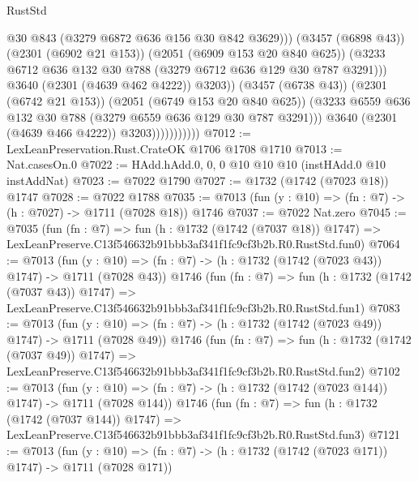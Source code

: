 \begin{lexlean}{RustStd}
\begin{coremodule}
                                      @30
                                      @843
                                      (@3279 @6872 @636 @156 @30 @842 @3629)))
                                  (@3457 (@6898 @43))
                                  (@2301 (@6902 @21 @153))
                                  (@2051 (@6909 @153 @20 @840 @625))
                                  (@3233
                                    @6712
                                    @636
                                    @132
                                    @30
                                    @788
                                    (@3279 @6712 @636 @129 @30 @787 @3291)))
                                @3640
                                (@2301 (@4639 @462 @4222))
                                @3203))
                            (@3457 (@6738 @43))
                            (@2301 (@6742 @21 @153))
                            (@2051 (@6749 @153 @20 @840 @625))
                            (@3233 @6559 @636 @132 @30 @788 (@3279 @6559 @636 @129 @30 @787 @3291)))
                          @3640
                          (@2301 (@4639 @466 @4222))
                          @3203)))))))))))
@7012 := LexLeanPreservation.Rust.CrateOK @1706 @1708 @1710
@7013 := Nat.casesOn.{0}
@7022 := HAdd.hAdd.{0, 0, 0} @10 @10 @10 (instHAdd.{0} @10 instAddNat)
@7023 := @7022 @1790
@7027 := @1732 (@1742 (@7023 @18)) @1747
@7028 := @7022 @1788
@7035 := @7013 (fun (y : @10) => (fn : @7) -> (h : @7027) -> @1711 (@7028 @18)) @1746
@7037 := @7022 Nat.zero
@7045 := @7035
    (fun (fn : @7) =>
    fun (h : @1732 (@1742 (@7037 @18)) @1747) =>
    LexLeanPreserve.C13f546632b91bbb3af341f1fc9cf3b2b.R0.RustStd.fun0)
@7064 := @7013
    (fun (y : @10) => (fn : @7) -> (h : @1732 (@1742 (@7023 @43)) @1747) -> @1711 (@7028 @43))
    @1746
    (fun (fn : @7) =>
    fun (h : @1732 (@1742 (@7037 @43)) @1747) =>
    LexLeanPreserve.C13f546632b91bbb3af341f1fc9cf3b2b.R0.RustStd.fun1)
@7083 := @7013
    (fun (y : @10) => (fn : @7) -> (h : @1732 (@1742 (@7023 @49)) @1747) -> @1711 (@7028 @49))
    @1746
    (fun (fn : @7) =>
    fun (h : @1732 (@1742 (@7037 @49)) @1747) =>
    LexLeanPreserve.C13f546632b91bbb3af341f1fc9cf3b2b.R0.RustStd.fun2)
@7102 := @7013
    (fun (y : @10) => (fn : @7) -> (h : @1732 (@1742 (@7023 @144)) @1747) -> @1711 (@7028 @144))
    @1746
    (fun (fn : @7) =>
    fun (h : @1732 (@1742 (@7037 @144)) @1747) =>
    LexLeanPreserve.C13f546632b91bbb3af341f1fc9cf3b2b.R0.RustStd.fun3)
@7121 := @7013
    (fun (y : @10) => (fn : @7) -> (h : @1732 (@1742 (@7023 @171)) @1747) -> @1711 (@7028 @171))

\end{coremodule}
\end{lexlean}
